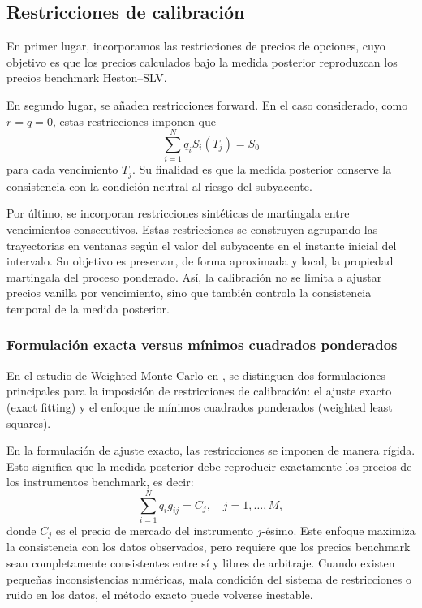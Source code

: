%
\subsection{Restricciones de calibración}

 En primer lugar, incorporamos las restricciones de precios de opciones, cuyo objetivo es que los precios calculados bajo la medida posterior reproduzcan los precios benchmark Heston--SLV.

En segundo lugar, se añaden restricciones forward. En el caso considerado, como \(r=q=0\), estas restricciones imponen que
\[
\sum_{i=1}^{N} q_i S_i(T_j)=S_0
\]
para cada vencimiento \(T_j\). Su finalidad es que la medida posterior conserve la consistencia con la condición neutral al riesgo del subyacente.

Por último, se incorporan restricciones sintéticas de martingala entre vencimientos consecutivos. Estas restricciones se construyen agrupando las trayectorias en ventanas según el valor del subyacente en el instante inicial del intervalo. Su objetivo es preservar, de forma aproximada y local, la propiedad martingala del proceso ponderado. Así, la calibración no se limita a ajustar precios vanilla por vencimiento, sino que también controla la consistencia temporal de la medida posterior.

\subsubsection{Formulación exacta versus mínimos cuadrados ponderados}

En el estudio de Weighted Monte Carlo en \cite{articleAvellaneda, articleElices}, se distinguen dos formulaciones principales para la imposición de restricciones de calibración: el ajuste exacto (exact fitting) y el enfoque de mínimos cuadrados ponderados (weighted least squares).

En la formulación de ajuste exacto, las restricciones se imponen de manera rígida. Esto significa que la medida posterior debe reproducir exactamente los precios de los instrumentos benchmark, es decir:
\[
\sum_{i=1}^{N} q_i g_{ij} = C_j, \quad j = 1,\ldots,M,
\]
donde \(C_j\) es el precio de mercado del instrumento \(j\)-ésimo. Este enfoque maximiza la consistencia con los datos observados, pero requiere que los precios benchmark sean completamente consistentes entre sí y libres de arbitraje. Cuando existen pequeñas inconsistencias numéricas, mala condición del sistema de restricciones o ruido en los datos, el método exacto puede volverse inestable.

